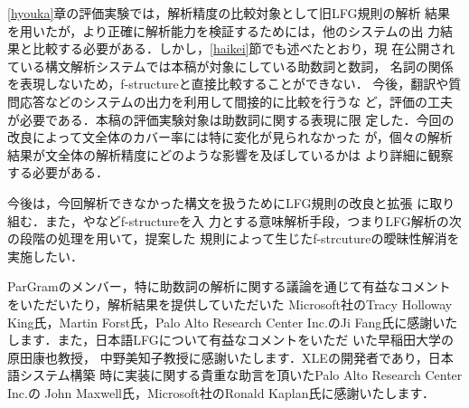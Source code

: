 \documentclass[japanese]{jnlp_1.4}
\begin{document}
\ref{hyouka}章の評価実験では，解析精度の比較対象として旧LFG規則の解析
結果を用いたが，より正確に解析能力を検証するためには，他のシステムの出
力結果と比較する必要がある．しかし，\ref{haikei}節でも述べたとおり，現
在公開されている構文解析システムでは本稿が対象にしている助数詞と数詞，
名詞の関係を表現しないため，f-structureと直接比較することができない．
今後，翻訳や質問応答などのシステムの出力を利用して間接的に比較を行うな
ど，評価の工夫が必要である．本稿の評価実験対象は助数詞に関する表現に限
定した．今回の改良によって文全体のカバー率には特に変化が見られなかった
が，個々の解析結果が文全体の解析精度にどのような影響を及ぼしているかは
より詳細に観察する必要がある．

今後は，今回解析できなかった構文を扱うためにLFG規則の改良と拡張
に取り組む．また，\cite{umemoto}や\cite{Crouch}などf-structureを入
力とする意味解析手段，つまりLFG解析の次の段階の処理を用いて，提案した
規則によって生じたf-strcutureの曖昧性解消を実施したい．



\acknowledgment

 ParGramのメンバー，特に助数詞の解析に関する議論を通じて有益なコメント
 をいただいたり，解析結果を提供していただいた Microsoft社のTracy
 Holloway King氏，Martin Forst氏，Palo Alto Research Center Inc.のJi
 Fang氏に感謝いたします．また，日本語LFGについて有益なコメントをいただ
 いた早稲田大学の原田康也教授，
 中野美知子教授に感謝いたします．XLEの開発者であり，日本語システム構築
 時に実装に関する貴重な助言を頂いたPalo Alto Research Center Inc.の
 John Maxwell氏，Microsoft社のRonald Kaplan氏に感謝いたします．





\begin{biography}



\end{biography}

\biodate
\end{document}
